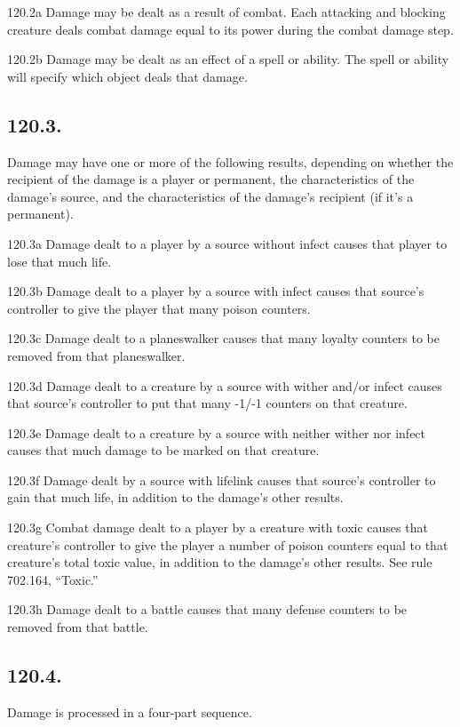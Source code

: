 120.2a Damage may be dealt as a result of combat. Each attacking and blocking creature deals combat damage equal to its power during the combat damage step.

120.2b Damage may be dealt as an effect of a spell or ability. The spell or ability will specify which object deals that damage.

\subsection*{120.3.}
Damage may have one or more of the following results, depending on whether the recipient of the damage is a player or permanent, the characteristics of the damage’s source, and the characteristics of the damage’s recipient (if it’s a permanent).

120.3a Damage dealt to a player by a source without infect causes that player to lose that much life.

120.3b Damage dealt to a player by a source with infect causes that source’s controller to give the player that many poison counters.

120.3c Damage dealt to a planeswalker causes that many loyalty counters to be removed from that planeswalker.

120.3d Damage dealt to a creature by a source with wither and/or infect causes that source’s controller to put that many -1/-1 counters on that creature.

120.3e Damage dealt to a creature by a source with neither wither nor infect causes that much damage to be marked on that creature.

120.3f Damage dealt by a source with lifelink causes that source’s controller to gain that much life, in addition to the damage’s other results.

120.3g Combat damage dealt to a player by a creature with toxic causes that creature’s controller to give the player a number of poison counters equal to that creature’s total toxic value, in addition to the damage’s other results. See rule 702.164, “Toxic.”

120.3h Damage dealt to a battle causes that many defense counters to be removed from that battle.

\subsection*{120.4.}
Damage is processed in a four-part sequence.

